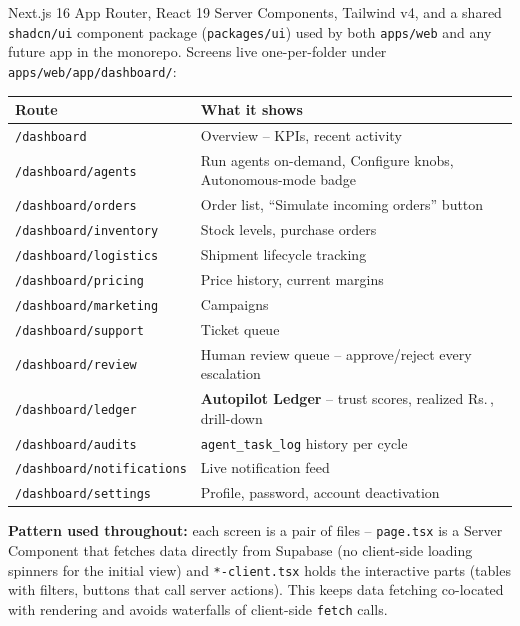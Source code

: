 \documentclass[11pt,a4paper]{article}
\newcommand{\Rs}{Rs.\,}
\begin{document}
Next.js 16 App Router, React 19 Server Components, Tailwind v4, and a shared \texttt{shadcn/ui}
component package (\texttt{packages/ui}) used by both \texttt{apps/web} and any future app in
the monorepo. Screens live one-per-folder under \texttt{apps/web/app/dashboard/}:

\begin{center}
\begin{tabular}{@{}ll@{}}
\toprule
\textbf{Route} & \textbf{What it shows} \\
\midrule
\texttt{/dashboard} & Overview -- KPIs, recent activity \\
\texttt{/dashboard/agents} & Run agents on-demand, Configure knobs, Autonomous-mode badge \\
\texttt{/dashboard/orders} & Order list, ``Simulate incoming orders'' button \\
\texttt{/dashboard/inventory} & Stock levels, purchase orders \\
\texttt{/dashboard/logistics} & Shipment lifecycle tracking \\
\texttt{/dashboard/pricing} & Price history, current margins \\
\texttt{/dashboard/marketing} & Campaigns \\
\texttt{/dashboard/support} & Ticket queue \\
\texttt{/dashboard/review} & Human review queue -- approve/reject every escalation \\
\texttt{/dashboard/ledger} & \textbf{Autopilot Ledger} -- trust scores, realized \Rs{}, drill-down \\
\texttt{/dashboard/audits} & \texttt{agent\_task\_log} history per cycle \\
\texttt{/dashboard/notifications} & Live notification feed \\
\texttt{/dashboard/settings} & Profile, password, account deactivation \\
\bottomrule
\end{tabular}
\end{center}

\textbf{Pattern used throughout:} each screen is a pair of files -- \texttt{page.tsx} is a
Server Component that fetches data directly from Supabase (no client-side loading spinners for
the initial view) and \texttt{*-client.tsx} holds the interactive parts (tables with filters,
buttons that call server actions). This keeps data fetching co-located with rendering and
avoids waterfalls of client-side \texttt{fetch} calls.

\end{document}
